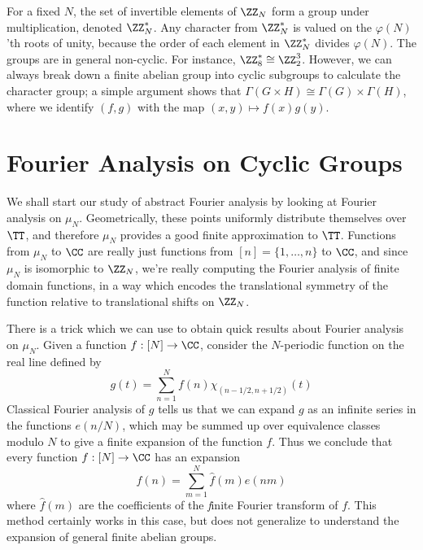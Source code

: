\begin{example}
    For a fixed $N$, the set of invertible elements of $\ZZ_N$ form a group under multiplication, denoted $\ZZ_N^*$. Any character from $\ZZ_N^*$ is valued on the $\varphi(N)$'th roots of unity, because the order of each element in $\ZZ_N^*$ divides $\varphi(N)$. The groups are in general non-cyclic. For instance, $\ZZ_8^* \cong \ZZ_2^3$. However, we can always break down a finite abelian group into cyclic subgroups to calculate the character group; a simple argument shows that $\Gamma(G \times H) \cong \Gamma(G) \times \Gamma(H)$, where we identify $(f,g)$ with the map $(x,y) \mapsto f(x)g(y)$.
\end{example}

\section{Fourier Analysis on Cyclic Groups}

We shall start our study of abstract Fourier analysis by looking at Fourier analysis on $\mu_N$. Geometrically, these points uniformly distribute themselves over $\TT$, and therefore $\mu_N$ provides a good finite approximation to $\TT$. Functions from $\mu_N$ to $\CC$ are really just functions from $[n] = \{ 1, \dots, n \}$ to $\CC$, and since $\mu_N$ is isomorphic to $\ZZ_N$, we're really computing the Fourier analysis of finite domain functions, in a way which encodes the translational symmetry of the function relative to translational shifts on $\ZZ_N$.

There is a trick which we can use to obtain quick results about Fourier analysis on $\mu_N$. Given a function $f: [N] \to \CC$, consider the $N$-periodic function on the real line defined by
%
\[ g(t) = \sum_{n = 1}^N f(n) \chi_{(n-1/2,n+1/2)}(t) \]
%
Classical Fourier analysis of $g$ tells us that we can expand $g$ as an infinite series in the functions $e(n/N)$, which may be summed up over equivalence classes modulo $N$ to give a finite expansion of the function $f$. Thus we conclude that every function $f: [N] \to \CC$ has an expansion
%
\[ f(n) = \sum_{m = 1}^N \widehat{f}(m) e(nm) \]
%
where $\widehat{f}(m)$ are the coefficients of the {\emph finite Fourier transform} of $f$. This method certainly works in this case, but does not generalize to understand the expansion of general finite abelian groups.

